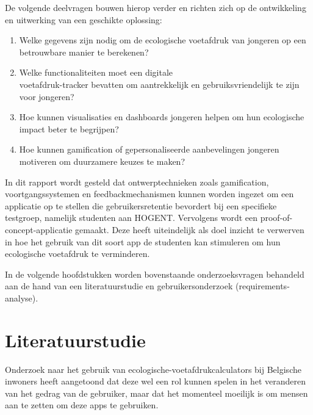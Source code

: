 \documentclass{hogent-article}
\begin{document}
    De volgende deelvragen bouwen hierop verder en richten zich op de ontwikkeling en uitwerking van een geschikte oplossing:
    
    \begin{enumerate}[start=6]
        \item Welke gegevens zijn nodig om de ecologische voetafdruk van jongeren op een betrouwbare manier te berekenen?
        \item Welke functionaliteiten moet een digitale\\ voet\-afdruk\--tracker bevatten om aantrekkelijk en gebruiksvriendelijk te zijn voor jongeren? 
        \item Hoe kunnen visualisaties en dashboards jongeren helpen om hun ecologische impact beter te begrijpen? 
        \item Hoe kunnen gamification of gepersonaliseer\-de aanbevelingen jongeren motiveren om duurzamere keuzes te maken? 
    \end{enumerate}
    
    In dit rapport wordt gesteld dat ontwerptechnieken zoals gamification, voortgangssystemen en feedbackmechanismen kunnen worden ingezet om een applicatie op te stellen die gebruikersretentie bevordert bij een specifieke testgroep, namelijk studenten aan HOGENT. Vervolgens wordt een proof-of-concept-applicatie gemaakt. Deze heeft uiteindelijk als doel inzicht te verwerven in hoe het gebruik van dit soort app de studenten kan stimuleren om hun ecologische voetafdruk te verminderen.
    
    In de volgende hoofdstukken worden bovenstaande onderzoeksvragen behandeld aan de hand van een literatuurstudie en gebruikersonderzoek (requirements-analyse).
    
    \section{Literatuurstudie}%
    \label{sec:literatuurstudie}

    
    Onderzoek naar het gebruik van ecologische-voetafdrukcalculators bij Belgische inwoners \autocite{Kok2021} heeft aangetoond dat deze wel een rol kunnen spelen in het veranderen van het gedrag van de gebruiker, maar dat het momenteel moeilijk is om mensen aan te zetten om deze apps te gebruiken.
    
\end{document}
